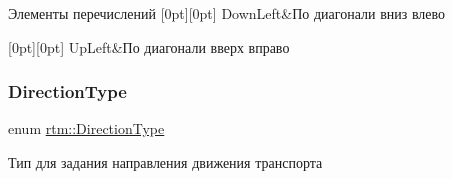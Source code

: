 \begin{DoxyEnumFields}{Элементы перечислений}
[0pt][0pt]{}\mbox{\label{namespacertm_a69dc82b16a0148c10962caa83d930f89ae2a6b2c371919b52750ac2f860bd193c}} 
Down\+Left&По диагонали вниз влево \\
\hline

[0pt][0pt]{}\mbox{\label{namespacertm_a69dc82b16a0148c10962caa83d930f89a77042a35db6a2e7c4d19c77ad81e77c3}} 
Up\+Left&По диагонали вверх вправо \\
\hline

\end{DoxyEnumFields}
\mbox{\label{namespacertm_a57b216f3aeb45041f3461bab08bc3aeb}} 
\subsubsection{\texorpdfstring{Direction\+Type}{DirectionType}}
{\footnotesize\ttfamily enum \hyperlink{namespacertm_a57b216f3aeb45041f3461bab08bc3aeb}{rtm\+::\+Direction\+Type}}



Тип для задания направления движения транспорта 

